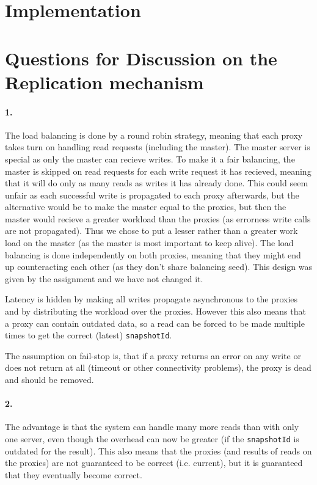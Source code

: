\documentclass[a4paper, 11pt]{article}
\begin{document}
\section{Implementation} %
\label{sec:implementation}



\section{Questions for Discussion on the Replication mechanism}

\paragraph{1.}
The load balancing is done by a round robin strategy, meaning that each proxy takes turn on handling read requests (including the master). The master server is special as only the master can recieve writes. To make it a fair balancing, the master is skipped on read requests for each write request it has recieved, meaning that it will do only as many reads as writes it has already done. This could seem unfair as each successful write is propagated to each proxy afterwards, but the alternative would be to make the master equal to the proxies, but then the master would recieve a greater workload than the proxies (as errorness write calls are not propagated). Thus we chose to put a lesser rather than a greater work load on the master (as the master is most important to keep alive).
The load balancing is done independently on both proxies, meaning that they might end up counteracting each other (as they don't share balancing seed). This design was given by the assignment and we have not changed it.

Latency is hidden by making all writes propagate asynchronous to the proxies and by distributing the workload over the proxies. However this also means that a proxy can contain outdated data, so a read can be forced to be made multiple times to get the correct (latest) \texttt{snapshotId}.

The assumption on fail-stop is, that if a proxy returns an error on any write or does not return at all (timeout or other connectivity problems), the proxy is dead and should be removed.

\paragraph{2.}
The advantage is that the system can handle many more reads than with only one server, even though the overhead can now be greater (if the \texttt{snapshotId} is outdated for the result). This also means that the proxies (and results of reads on the proxies) are not guaranteed to be correct (i.e. current), but it is guaranteed that they eventually become correct.
\end{document}
